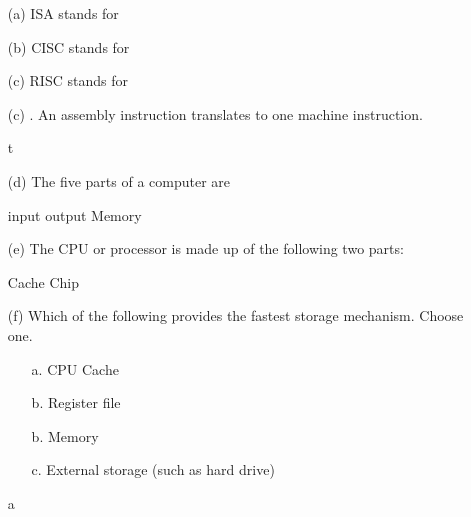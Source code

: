 \newpage
\nextq
\begin{itemize}

\item[(a)]
  ISA stands for
  
  \ANSWER\vspace{4mm}
  \begin{answercode}

  \end{answercode}

\item[(b)]
  CISC stands for
 
  \ANSWER\vspace{4mm}
  \begin{answercode}

  \end{answercode}

\item[(c)]
  RISC stands for
  \\
  \ANSWER\vspace{4mm}
  \begin{answercode}

  \end{answercode}
  
\item[(c)]
  \tf.
  An assembly instruction translates to one machine instruction.
  \\
  \ANSWER\vspace{4mm}
  \begin{answercode}
    t
  \end{answercode}
  
\item[(d)]
  The five parts of a computer are
  \\
  \ANSWER\vspace{4mm}
  \begin{answercode}
    input
    output
    Memory

  \end{answercode}

  
\item[(e)]
  The CPU or processor is made up of the following two parts:
  \\
  \ANSWER\vspace{4mm}
  \begin{answercode}
    Cache
    Chip
  \end{answercode}
  
\item[(f)]
  Which of the following provides the fastest
  storage mechanism. Choose one.
  \begin{itemize}
  \item[a.] CPU Cache
  \item[b.] Register file
  \item[b.] Memory
  \item[c.] External storage (such as hard drive)
  \end{itemize}
  \ANSWER\vspace{4mm}
  \begin{answercode}
    a
  \end{answercode}
\end{itemize}

